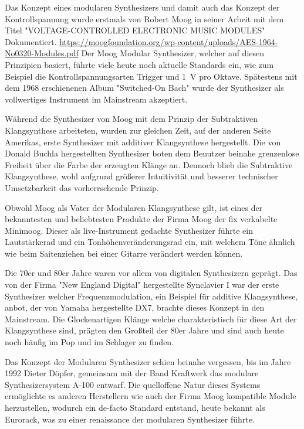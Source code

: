 Das Konzept eines modularen Synthesizers und damit auch das Konzept der Kontrollspannung wurde erstmals von Robert Moog in seiner Arbeit mit dem Titel "VOLTAGE-CONTROLLED ELECTRONIC MUSIC MODULES" Dokumentiert. \url{https://moogfoundation.org/wp-content/uploads/AES-1964-No0320-Modules.pdf} Der Moog Modular Synthesizer, welcher auf diesen Prinzipien basiert, führte viele heute noch aktuelle Standards ein, wie zum Beispiel die Kontrollspannungsarten Trigger und \SI{1}{\volt} pro Oktave. Spätestens mit dem 1968 erschienenen Album "Switched-On Bach" wurde der Synthesizer als vollwertiges Instrument im Mainstream akzeptiert.

Während die Synthesizer von Moog mit dem Prinzip der Subtraktiven Klangsynthese arbeiteten, wurden zur gleichen Zeit, auf der anderen Seite Amerikas, erste Synthesizer mit additiver Klangsynthese hergestellt. Die von Donald Buchla hergestellten Synthesizer boten dem Benutzer beinahe grenzenlose Freiheit über die Farbe der erzeugten Klänge an. Dennoch blieb die Subtraktive Klangsynthese, wohl aufgrund größerer Intuitivität und besserer technischer Umsetzbarkeit das vorherrschende Prinzip.

Obwohl Moog als Vater der Modularen Klangsynthese gilt, ist eines der bekanntesten und beliebtesten Produkte der Firma Moog der fix verkabelte Minimoog. Dieser als live-Instrument gedachte Synthesizer führte ein Lautstärkerad und ein Tonhöhenveränderungsrad ein, mit welchem Töne ähnlich wie beim Saitenziehen bei einer Gitarre verändert werden können.

Die 70er und 80er Jahre waren vor allem von digitalen Synthesizern geprägt. Das von der Firma "New England Digital" hergestellte Synclavier I war der erste Synthesizer welcher Frequenzmodulation, ein Beispiel für additive Klangsynthese, anbot, der von Yamaha hergestellte DX7, brachte dieses Konzept in den Mainstream. Die Glockenartigen Klänge welche charakteristisch für diese Art der Klangsynthese sind, prägten den Großteil der 80er Jahre und sind auch heute noch häufig im Pop und im Schlager zu finden.

Das Konzept der Modularen Synthesizer schien beinahe vergessen, bis im Jahre 1992 Dieter Döpfer, gemeinsam mit der Band Kraftwerk das modulare Synthesizersystem A-100 entwarf. Die quelloffene Natur dieses Systems ermöglichte es anderen Herstellern wie auch der Firma Moog kompatible Module herzustellen, wodurch ein de-facto Standard entstand, heute bekannt als Eurorack, was zu einer renaissance der modularen Synthesizer führte.

